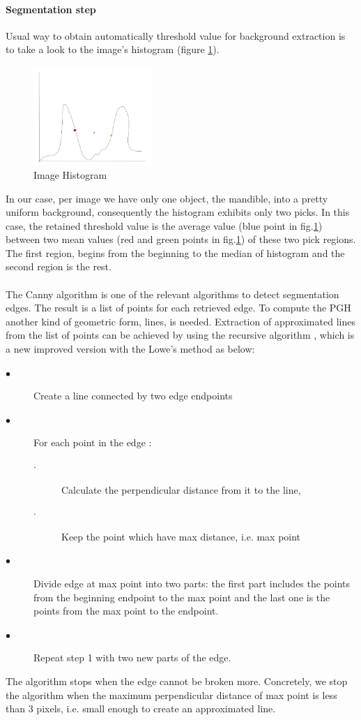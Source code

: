 \documentclass[twoside,twocolumn,10pt]{article}
\begin{document}
\paragraph{Segmentation step}
Usual way to obtain automatically threshold value for 
background extraction is to take a look to the image's histogram (figure
\ref{lm_hist1}). 
\begin{figure}
\centering
\includegraphics[width=4.5cm]{./images/hist}
\caption{\small{Image Histogram}}
\label{lm_hist1}
\end{figure}
In our case, per image we have only one object, the mandible,  into a
pretty uniform background, consequently the histogram exhibits only two
picks. In this case, the retained threshold value is the average 
value (blue point in fig.\ref{lm_hist1}) between two mean values (red and
green points in fig.\ref{lm_hist1}) of these two pick regions. The first region,
begins from the beginning to the median of histogram and the second region is the rest.\\
\\
The Canny algorithm \cite{canny1986computational} is one of the
relevant algorithms to detect segmentation edges. The result is a list
of points for each retrieved edge. To compute the PGH another kind of
geometric form, lines, is needed. Extraction of approximated lines
from the list of points can be achieved by using the
recursive algorithm \cite{thacker1995assessing}, which is a new improved version with the Lowe's method\cite{lowe1987three} as below:
{\small{\begin{description}
    \item[$\bullet$] Create a line connected by two edge endpoints
    \item[$\bullet$] For each point in the edge :
      \begin{description}
    		  \item[$\cdot$] Calculate the perpendicular distance from it to the line,
      	  \item[$\cdot$] Keep the point which have max distance, i.e. max point
 	 \end{description}
	  \item[$\bullet$] Divide edge at max point into two parts: the first part includes the points from the beginning endpoint to the max point and the last one is the points from the max point to  the endpoint.
      \item[$\bullet$] Repeat step 1 with two new parts of the edge.
  \end{description}
 } }
The algorithm stops when the edge cannot be broken more. Concretely,
we stop the algorithm when the maximum perpendicular distance of max
point is less than $3$ pixels, i.e. small enough to create an approximated line.
\end{document}
